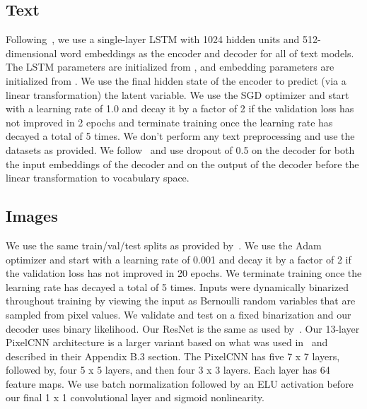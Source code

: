 \documentclass{article} \usepackage{iclr2019_conference,times}
\begin{document}
\subsection{Text}\label{apdix:text}
Following~\citet{kim2018semi}, we use a single-layer LSTM with 1024 hidden units and 512-dimensional word embeddings as the encoder and decoder for all of text models. The LSTM parameters are initialized from , and embedding parameters are initialized from . We use the final hidden state of the encoder to predict (via a linear transformation) the latent variable. We use the SGD optimizer and start with a learning rate of 1.0 and decay it by a factor of 2 if the validation loss has not improved in 2 epochs and terminate training once the learning rate has decayed a total of 5 times. We don't perform any text preprocessing and use the datasets as provided. We follow~\citet{kim2018semi} and use dropout of 0.5 on the decoder for both the input embeddings of the decoder and on the output of the decoder before the linear transformation to vocabulary space.

\subsection{Images}\label{apdix:image}
We use the same train/val/test splits as provided by~\cite{kim2018semi}. We use the Adam optimizer and start with a learning rate of 0.001 and decay it by a factor of 2 if the validation loss has not improved in 20 epochs. We terminate training once the learning rate has decayed a total of 5 times. Inputs were dynamically binarized throughout training by viewing the input as Bernoulli random variables that are sampled from pixel values. We validate and test on a fixed binarization and our decoder uses binary likelihood. Our ResNet is the same as used by~\cite{chen2016variational}. Our 13-layer PixelCNN architecture is a larger variant based on what was used in~\cite{kim2018semi} and described in their Appendix B.3 section. The PixelCNN has five 7 x 7 layers, followed by, four 5 x 5 layers, and then four 3 x 3 layers. Each layer has 64 feature maps. We use batch normalization followed by an ELU activation before our final 1 x 1 convolutional layer and sigmoid nonlinearity.
\end{document}
